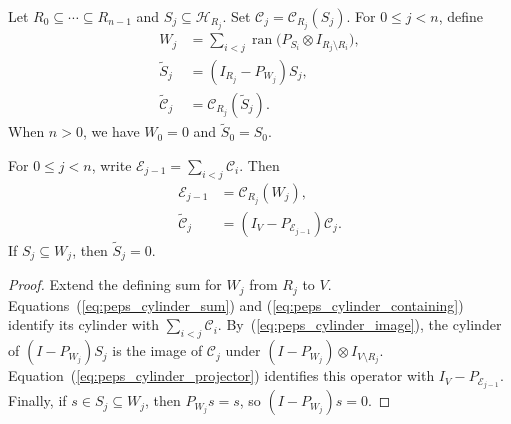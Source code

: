 \begin{definition}
    \label{def:peps_nested_cylinder_images}
    \leanok
    Let $R_0\subseteq\cdots\subseteq R_{n-1}$ and
    $S_j\subseteq\mathcal H_{R_j}$. Set $\mathcal C_j=\mathcal C_{R_j}(S_j)$.
    For $0\leq j<n$, define
    \begin{align}
        W_j                      & =\sum_{i<j}
        \operatorname{ran}\bigl(P_{S_i}\otimes I_{R_j\setminus R_i}\bigr),
        \label{eq:peps_cylinder_earlier_inside}                       \\
        \widetilde S_j           & =(I_{R_j}-P_{W_j})S_j,
        \label{eq:peps_cylinder_innovation}                           \\
        \widetilde{\mathcal C}_j & =\mathcal C_{R_j}(\widetilde S_j).
        \label{eq:peps_cylinder_innovation_global}
    \end{align}
    When $n>0$, we have $W_0=0$ and $\widetilde S_0=S_0$.
\end{definition}

\begin{lemma}
    \label{thm:peps_nested_cylinder_images}
    \leanok
    For $0\leq j<n$, write $\mathcal E_{j-1}=\sum_{i<j}\mathcal C_i$. Then
    \begin{align}
        \mathcal E_{j-1}         & =\mathcal C_{R_j}(W_j),
        \label{eq:peps_cylinder_earlier_span}                               \\
        \widetilde{\mathcal C}_j & =(I_V-P_{\mathcal E_{j-1}})\mathcal C_j.
        \label{eq:peps_cylinder_global_image}
    \end{align}
    If $S_j\subseteq W_j$, then $\widetilde S_j=0$.
\end{lemma}
\begin{proof}
    \leanok
    Extend the defining sum for $W_j$ from $R_j$ to $V$.
    Equations~(\ref{eq:peps_cylinder_sum}) and
    (\ref{eq:peps_cylinder_containing}) identify its cylinder with
    $\sum_{i<j}\mathcal C_i$. By~(\ref{eq:peps_cylinder_image}),
    the cylinder of $(I-P_{W_j})S_j$ is the image of $\mathcal C_j$ under
    $(I-P_{W_j})\otimes I_{V\setminus R_j}$.
    Equation~(\ref{eq:peps_cylinder_projector}) identifies this operator
    with $I_V-P_{\mathcal E_{j-1}}$.
    Finally, if $s\in S_j\subseteq W_j$, then $P_{W_j}s=s$, so
    $(I-P_{W_j})s=0$.
\end{proof}


